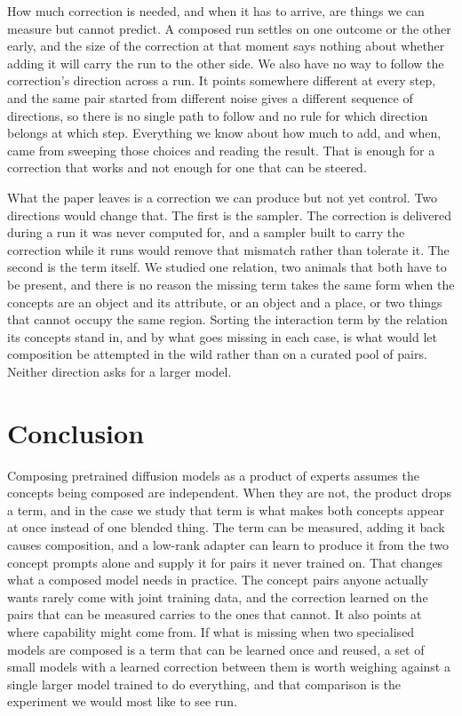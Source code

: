 \documentclass{article} %
\begin{document}
How much correction is needed, and when it has to arrive, are things we can measure but cannot predict. A composed run settles on one outcome or the other early, and the size of the correction at that moment says nothing about whether adding it will carry the run to the other side. We also have no way to follow the correction's direction across a run. It points somewhere different at every step, and the same pair started from different noise gives a different sequence of directions, so there is no single path to follow and no rule for which direction belongs at which step. Everything we know about how much to add, and when, came from sweeping those choices and reading the result. That is enough for a correction that works and not enough for one that can be steered.

What the paper leaves is a correction we can produce but not yet control. Two directions would change that. The first is the sampler. The correction is delivered during a run it was never computed for, and a sampler built to carry the correction while it runs would remove that mismatch rather than tolerate it. The second is the term itself. We studied one relation, two animals that both have to be present, and there is no reason the missing term takes the same form when the concepts are an object and its attribute, or an object and a place, or two things that cannot occupy the same region. Sorting the interaction term by the relation its concepts stand in, and by what goes missing in each case, is what would let composition be attempted in the wild rather than on a curated pool of pairs. Neither direction asks for a larger model.

\section{Conclusion}
\label{sec:conclusion}

Composing pretrained diffusion models as a product of experts assumes the concepts being composed are independent. When they are not, the product drops a term, and in the case we study that term is what makes both concepts appear at once instead of one blended thing. The term can be measured, adding it back causes composition, and a low-rank adapter can learn to produce it from the two concept prompts alone and supply it for pairs it never trained on. That changes what a composed model needs in practice. The concept pairs anyone actually wants rarely come with joint training data, and the correction learned on the pairs that can be measured carries to the ones that cannot. It also points at where capability might come from. If what is missing when two specialised models are composed is a term that can be learned once and reused, a set of small models with a learned correction between them is worth weighing against a single larger model trained to do everything, and that comparison is the experiment we would most like to see run.
\end{document}
